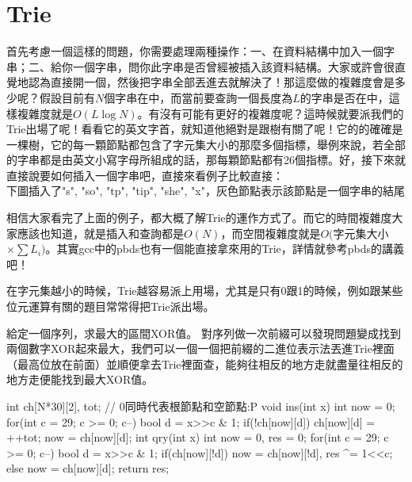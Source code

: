 \documentclass[main.tex]{subfiles}
\begin{document}
\section{Trie}
首先考慮一個這樣的問題，你需要處理兩種操作：一、在資料結構中加入一個字串；二、給你一個字串，問你此字串是否曾經被插入該資料結構。大家或許會很直覺地認為直接開一個，然後把字串全部丟進去就解決了！那這麼做的複雜度會是多少呢？假設目前有$N$個字串在中，而當前要查詢一個長度為$L$的字串是否在中，這樣複雜度就是$O(L\log N)$。有沒有可能有更好的複雜度呢？這時候就要派我們的Trie出場了呢！看看它的英文字首，就知道他絕對是跟樹有關了呢！它的的確確是一棵樹，它的每一顆節點都包含了字元集大小的那麼多個指標，舉例來說，若全部的字串都是由英文小寫字母所組成的話，那每顆節點都有26個指標。好，接下來就直接說要如何插入一個字串吧，直接來看例子比較直接：\\
下圖插入了"s", "so", "tp", "tip", "she", "x"，灰色節點表示該節點是一個字串的結尾
\begin{center}

\iftrue
{}
\fi
\end{center}
相信大家看完了上面的例子，都大概了解Trie的運作方式了。而它的時間複雜度大家應該也知道，就是插入和查詢都是$O(N)$，而空間複雜度就是$O($字元集大小$\times \sum L_i)$。其實gcc中的pbds也有一個能直接拿來用的Trie，詳情就參考pbds的講義吧！

在字元集越小的時候，Trie越容易派上用場，尤其是只有0跟1的時候，例如跟某些位元運算有關的題目常常得把Trie派出場。

 {
給定一個序列，求最大的區間XOR值。
}
對序列做一次前綴可以發現問題變成找到兩個數字XOR起來最大，我們可以一個一個把前綴的二進位表示法丟進Trie裡面（最高位放在前面）並順便拿去Trie裡面查，能夠往相反的地方走就盡量往相反的地方走便能找到最大XOR值。

\begin{C++}
int ch[N*30][2], tot; // 0同時代表根節點和空節點:P
void ins(int x) {
	int now = 0;
	for(int c = 29; c >= 0; c--) {
		bool d = x>>c & 1;
		if(!ch[now][d])
			ch[now][d] = ++tot;
		now = ch[now][d];
	}
}
int qry(int x) {
	int now = 0, res = 0;
	for(int c = 29; c >= 0; c--) {
		bool d = x>>c & 1;
		if(ch[now][!d])
			now = ch[now][!d], res ^= 1<<c;
		else
			now = ch[now][d];	
	}
	return res;
}
\end{C++}
\end{document}
